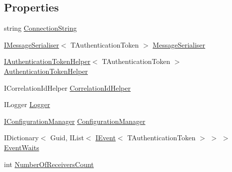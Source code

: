 \subsection*{Properties}
\begin{DoxyCompactItemize}
\item 
string \hyperlink{classCqrs_1_1Azure_1_1ServiceBus_1_1AzureBus_aaccdbc8cd25d3ae4f1a2801d2ad02a96}{Connection\+String}
\item 
\hyperlink{interfaceCqrs_1_1Azure_1_1ServiceBus_1_1IMessageSerialiser}{I\+Message\+Serialiser}$<$ T\+Authentication\+Token $>$ \hyperlink{classCqrs_1_1Azure_1_1ServiceBus_1_1AzureBus_ab6f7a7530a01f23ddec8029fe832392d}{Message\+Serialiser}
\item 
\hyperlink{interfaceCqrs_1_1Authentication_1_1IAuthenticationTokenHelper}{I\+Authentication\+Token\+Helper}$<$ T\+Authentication\+Token $>$ \hyperlink{classCqrs_1_1Azure_1_1ServiceBus_1_1AzureBus_a5250b75a5ef26d52a96da74777958519}{Authentication\+Token\+Helper}
\item 
I\+Correlation\+Id\+Helper \hyperlink{classCqrs_1_1Azure_1_1ServiceBus_1_1AzureBus_aade10189c32052d50e067be90cb4fe1c}{Correlation\+Id\+Helper}
\item 
I\+Logger \hyperlink{classCqrs_1_1Azure_1_1ServiceBus_1_1AzureBus_ad9bfb86c6f7724ce0729d45ddad4fbf5}{Logger}
\item 
\hyperlink{interfaceCqrs_1_1Configuration_1_1IConfigurationManager}{I\+Configuration\+Manager} \hyperlink{classCqrs_1_1Azure_1_1ServiceBus_1_1AzureBus_aaf9469d220fb23cb0521fa76b25ab228}{Configuration\+Manager}
\item 
I\+Dictionary$<$ Guid, I\+List$<$ \hyperlink{interfaceCqrs_1_1Events_1_1IEvent}{I\+Event}$<$ T\+Authentication\+Token $>$ $>$ $>$ \hyperlink{classCqrs_1_1Azure_1_1ServiceBus_1_1AzureBus_ae3c0fd5566add5441bb70b48eceb98be}{Event\+Waits}
\item 
int \hyperlink{classCqrs_1_1Azure_1_1ServiceBus_1_1AzureBus_a65ca2b61bf8f2dba9d0e0f54ec64c2b9}{Number\+Of\+Receivers\+Count}

\end{DoxyCompactItemize}
